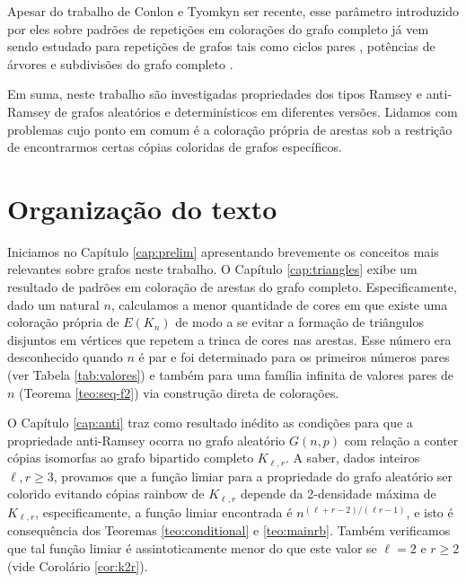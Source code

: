 \documentclass[12pt,a4paper]{book}
\newcommand{\K}{K_{\ell,r}} %
\begin{document}
Apesar do trabalho de Conlon e Tyomkyn ser recente, esse parâmetro introduzido por eles sobre padrões de repetições em colorações do grafo completo já vem sendo estudado para repetições de grafos tais como ciclos pares \cite{janzer2023rainbow}, potências de árvores \cite{liu2022color} e subdivisões do grafo completo \cite{xu2022color}.

Em suma, neste trabalho 
são investigadas propriedades dos tipos Ramsey e anti-Ramsey
de grafos aleatórios e determinísticos em diferentes versões. 
Lidamos com problemas cujo ponto em comum é a coloração própria de arestas sob a restrição de encontrarmos certas cópias coloridas de grafos específicos.



\section*{Organização do texto}


Iniciamos no Capítulo \ref{cap:prelim} apresentando brevemente os conceitos mais relevantes sobre grafos neste trabalho.
O Capítulo \ref{cap:triangles} exibe um resultado de padrões em coloração de arestas do grafo completo. 
Especificamente, dado um natural $n$, calculamos a menor 
quantidade de cores em que existe uma coloração própria de $E(K_n)$ de modo a se evitar a formação de triângulos disjuntos em vértices que repetem a trinca de cores nas arestas.
Esse número era desconhecido quando $n$ é par e foi determinado para os primeiros números pares (ver Tabela \ref{tab:valores}) e também para uma família infinita de valores pares de $n$ (Teorema \ref{teo:seq-f2}) via  construção direta de colorações.


 O Capítulo \ref{cap:anti} traz como resultado inédito as condições para que a propriedade anti-Ramsey ocorra no grafo aleatório $G(n,p)$ com relação a conter cópias isomorfas ao grafo bipartido completo $\K$. 
A saber, dados inteiros $\ell,r \geq 3$, provamos que a função limiar para a propriedade do grafo aleatório ser colorido evitando cópias rainbow de $\K$ depende da 2-densidade máxima de $\K$, especificamente, a função limiar encontrada é 
$n^{(\ell+r-2)/(\ell r-1)}$, e isto é consequência dos Teoremas \ref{teo:conditional} e \ref{teo:mainrb}.
Também verificamos que tal função limiar é assintoticamente menor do que este valor se $\ell=2$ e $r\geq 2$ (vide Corolário \ref{cor:k2r}).
\end{document}
